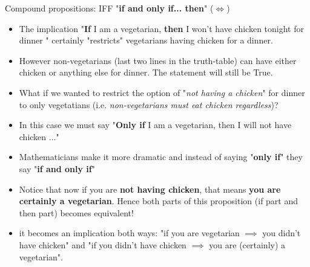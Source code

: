 \documentclass[11pt,aspectratio=1610]{beamer}
\begin{document}
	

	
	
\begin{frame}{Compound propositions: IFF "\textbf{if and only if... then}" ($\iff$) }
	\p
	
\begin{itemize}\itemsep2mm
	\item The implication "\textbf{If} I am a vegetarian, \textbf{then} I won't have chicken tonight for dinner " certainly "restricts" vegetarians having chicken for a dinner.\p
	
	\item However non-vegetarians (last two lines in the truth-table) can have either chicken or anything else for dinner. The statement will still be True.\p
	
	\item What if we wanted to restrict the option of "\textit{not having a chicken}" for dinner to only vegetatians (i.e. \textit{non-vegetarians must eat chicken regardless})? \p
	
	\item In this case we must say "\textbf{Only if} I am a vegetarian, then I will not have chicken ..." \p
	
	\item Mathematicians make it more dramatic and instead of saying "\textbf{only if}" they say "\textbf{if and only if}" \p
	
	\item Notice that now if you are \textbf{not having chicken}, that means \textbf{you are certainly a vegetarian}. Hence both parts of this proposition (if part and then part) becomes equivalent! \p
	
	\item it becomes an implication both ways: "if you are vegetarian $\implies$ you didn't have chicken" and "if you didn't have chicken $\implies$ you are (certainly) a vegetarian". 
\end{itemize}

 



 
	
	
\end{frame}	
	
	
	
\end{document}
